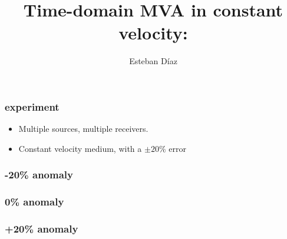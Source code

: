 



\title[]{Time-domain MVA in constant velocity:}
\subtitle{}
\author[]{Esteban  D\'{i}az}
\date{}
\logo{}

\def\big#1{\begin{center} \LARGE \textbf{#1} \end{center}}
\def\cen#1{\begin{center}        \textbf{#1} \end{center}}

 { \cwpcover }

\begin{frame}

\end{frame}


\begin{frame} \frametitle{experiment}
\begin{itemize}

\item Multiple sources, multiple receivers.
\item Constant velocity medium, with a $\pm20\%$ error
\end{itemize}
\end{frame}





\begin{frame}\frametitle{-20\% anomaly}
\end{frame}

\begin{frame}\frametitle{0\% anomaly} 
\end{frame}
\begin{frame}\frametitle{+20\% anomaly} 
\end{frame}


